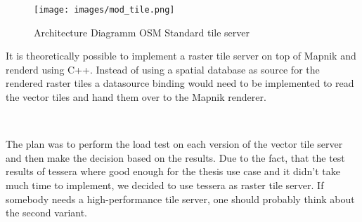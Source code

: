 \begin{figure}[H]
\centering
  \texttt{[image: images/mod\_tile.png]}
  \caption{Architecture Diagramm OSM Standard tile server}
\end{figure}

It is theoretically possible to implement a raster tile server
on top of Mapnik and renderd using C++. Instead of using a spatial database as source for the rendered raster tiles a datasource binding would need to be implemented to read the vector tiles and hand them over to the Mapnik renderer. 

\\
\begin{tcolorbox}[arc=0mm,boxrule=1pt,title=Decision]\label{tile_server_decision}
The plan was to perform the load test on each version of the vector tile server and then make the decision based on the results. Due to the fact, that the test results of tessera where good enough for the thesis use case and it didn't take much time to implement, we decided to use tessera as raster tile server.
If somebody needs a high-performance tile server, one should probably think about the second variant.
\end{tcolorbox}